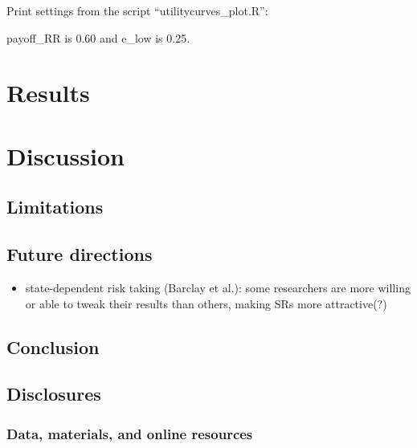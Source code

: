 \documentclass[british,,man,floatsintext]{apa6}
\providecommand{\tightlist}{%
  \setlength{\itemsep}{0pt}\setlength{\parskip}{0pt}}
\begin{document}
Print settings from the script \enquote{utilitycurves\_plot.R}:

payoff\_RR is \(0.60\) and e\_low is 0.25.

\hypertarget{results-1}{%
\section{Results}\label{results-1}}

\hypertarget{discussion}{%
\section{Discussion}\label{discussion}}

\hypertarget{limitations}{%
\subsection{Limitations}\label{limitations}}

\hypertarget{future-directions}{%
\subsection{Future directions}\label{future-directions}}

\begin{itemize}
\tightlist
\item
  state-dependent risk taking (Barclay et al.): some researchers are more willing or able to tweak their results than others, making SRs more attractive(?)
\end{itemize}

\hypertarget{conclusion}{%
\subsection{Conclusion}\label{conclusion}}

\hypertarget{disclosures}{%
\subsection{Disclosures}\label{disclosures}}

\hypertarget{data-materials-and-online-resources}{%
\subsubsection{Data, materials, and online resources}\label{data-materials-and-online-resources}}
\end{document}
